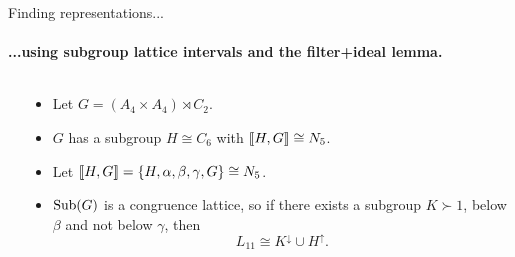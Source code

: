 \begin{frame}[label=knownresults,shrink=5]{Finding representations...}
  \framesubtitle{...using subgroup lattice intervals and the filter+ideal lemma.}

  \begin{columns}
    \begin{column}{0.2\textwidth}
      \begin{center}
      \end{center}
    \end{column}
    \begin{column}{0.6\textwidth}
      \vskip1cm
      \begin{itemize}
      \item<2-> 
        Let $G=(A_4 \times A_4) \rtimes C_2$. %
      \item<2-> $G$ has a subgroup $H \cong C_6$ with $\llbracket H, G \rrbracket \cong N_5$. \hskip6pt %
      \item<2-> Let $\llbracket H, G \rrbracket = \{H, \alpha, \beta, \gamma, G\} \cong N_5$.\vskip6pt
      \item<3-> $\mbox{Sub}(G)$ is a congruence lattice, so
        if there exists a subgroup $K \succ 1$, below $\beta$ and not below $\gamma$, 
        then \[L_{11} \cong K^\downarrow \cup H^\uparrow.\]
      \end{itemize}
    \end{column}
  \end{columns}


\end{frame}
